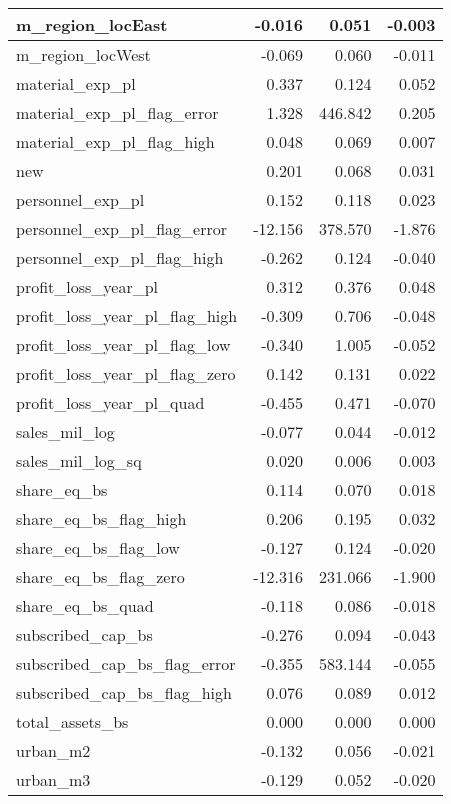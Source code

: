 \begin{table}
\begin{tabular}[t]{l|r|r|r}
\hline
m\_region\_locEast & -0.016 & 0.051 & -0.003\\
\hline
m\_region\_locWest & -0.069 & 0.060 & -0.011\\
\hline
material\_exp\_pl & 0.337 & 0.124 & 0.052\\
\hline
material\_exp\_pl\_flag\_error & 1.328 & 446.842 & 0.205\\
\hline
material\_exp\_pl\_flag\_high & 0.048 & 0.069 & 0.007\\
\hline
new & 0.201 & 0.068 & 0.031\\
\hline
personnel\_exp\_pl & 0.152 & 0.118 & 0.023\\
\hline
personnel\_exp\_pl\_flag\_error & -12.156 & 378.570 & -1.876\\
\hline
personnel\_exp\_pl\_flag\_high & -0.262 & 0.124 & -0.040\\
\hline
profit\_loss\_year\_pl & 0.312 & 0.376 & 0.048\\
\hline
profit\_loss\_year\_pl\_flag\_high & -0.309 & 0.706 & -0.048\\
\hline
profit\_loss\_year\_pl\_flag\_low & -0.340 & 1.005 & -0.052\\
\hline
profit\_loss\_year\_pl\_flag\_zero & 0.142 & 0.131 & 0.022\\
\hline
profit\_loss\_year\_pl\_quad & -0.455 & 0.471 & -0.070\\
\hline
sales\_mil\_log & -0.077 & 0.044 & -0.012\\
\hline
sales\_mil\_log\_sq & 0.020 & 0.006 & 0.003\\
\hline
share\_eq\_bs & 0.114 & 0.070 & 0.018\\
\hline
share\_eq\_bs\_flag\_high & 0.206 & 0.195 & 0.032\\
\hline
share\_eq\_bs\_flag\_low & -0.127 & 0.124 & -0.020\\
\hline
share\_eq\_bs\_flag\_zero & -12.316 & 231.066 & -1.900\\
\hline
share\_eq\_bs\_quad & -0.118 & 0.086 & -0.018\\
\hline
subscribed\_cap\_bs & -0.276 & 0.094 & -0.043\\
\hline
subscribed\_cap\_bs\_flag\_error & -0.355 & 583.144 & -0.055\\
\hline
subscribed\_cap\_bs\_flag\_high & 0.076 & 0.089 & 0.012\\
\hline
total\_assets\_bs & 0.000 & 0.000 & 0.000\\
\hline
urban\_m2 & -0.132 & 0.056 & -0.021\\
\hline
urban\_m3 & -0.129 & 0.052 & -0.020\\
\hline
\end{tabular}
\end{table}